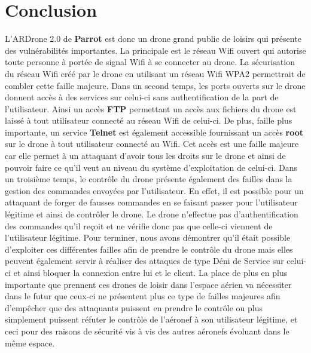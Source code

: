 \section{Conclusion}
L'ARDrone 2.0 de \textbf{Parrot} est donc un drone grand public de loisirs qui présente des vulnérabilités importantes. La principale est le réseau Wifi ouvert qui autorise toute personne à portée de signal Wifi à se connecter au drone. La sécurisation du réseau Wifi créé par le drone en utilisant un réseau Wifi WPA2 permettrait de combler cette faille majeure. Dans un second temps, les ports ouverts sur le drone donnent accès à des services sur celui-ci sans authentification de la part de l'utilisateur. Ainsi un accès \textbf{FTP} permettant un accès aux fichiers du drone est laissé à tout utilisateur connecté au réseau Wifi de celui-ci. De plus, faille plus importante, un service \textbf{Telnet} est également accessible fournissant un accès \textbf{root} sur le drone à tout utilisateur connecté au Wifi. Cet accès est une faille majeure car elle permet à un attaquant d'avoir tous les droits sur le drone et ainsi de pouvoir faire ce qu'il veut au niveau du système d'exploitation de celui-ci. Dans un troisième temps, le contrôle du drone présente également des failles dans la gestion des commandes envoyées par l'utilisateur. En effet, il est possible pour un attaquant de forger de fausses commandes en se faisant passer pour l'utilisateur légitime et ainsi de contrôler le drone. Le drone n'effectue pas d'authentification des commandes qu'il reçoit et ne vérifie donc pas que celle-ci viennent de l'utilisateur légitime. Pour terminer, nous avons démontrer qu'il était possible d'exploiter ces différentes failles afin de prendre le contrôle du drone mais elles peuvent également servir à réaliser des attaques de type Déni de Service sur celui-ci et ainsi bloquer la connexion entre lui et le client.
\newline La place de plus en plus importante que prennent ces drones de loisir dans l'espace aérien va nécessiter dans le futur que ceux-ci ne présentent plus ce type de failles majeures afin d'empêcher que des attaquants puissent en prendre le contrôle ou  plus simplement puissent réfuter le contrôle de l'aéronef à son utilisateur légitime, et ceci pour des raisons de sécurité vis à vis des autres aéronefs évoluant dans le même espace.
